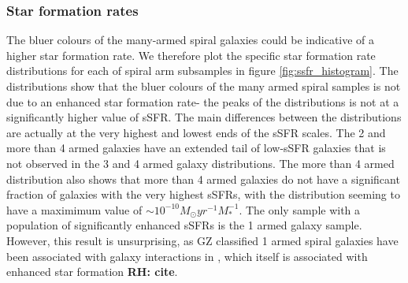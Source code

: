 \documentclass[useAMS,usenatbib]{mn2e}
\newcommand{\rh}[1]{{\bf \textcolor{RoyalPurple}{RH: #1}}}
\begin{document}

\subsubsection{Star formation rates}
\label{sec:SFR}

The bluer colours of the many-armed spiral galaxies could be indicative of a higher star formation rate. We therefore plot the specific star formation rate distributions for each of spiral arm subsamples in figure \ref{fig:ssfr_histogram}. The distributions show that the bluer colours of the many armed spiral samples is not due to an enhanced star formation rate- the peaks of the distributions is not at a significantly higher value of sSFR. The main differences between the distributions are actually at the very highest and lowest ends of the sSFR scales. The 2 and more than 4 armed galaxies have an extended tail of low-sSFR galaxies that is not observed in the 3 and 4 armed galaxy distributions. The more than 4 armed distribution also shows that more than 4 armed galaxies do not have a significant fraction of galaxies with the very highest sSFRs, with the distribution seeming to have a maximimum value of $\sim 10^{-10} M_{\odot} yr^{-1}M_*^{-1}$. The only sample with a population of significantly enhanced sSFRs is the 1 armed galaxy sample. However, this result is unsurprising, as GZ classified 1 armed spiral galaxies have been associated with galaxy interactions in \citet{Casteels_13}, which itself is associated with enhanced star formation \rh{cite}.
\end{document}
